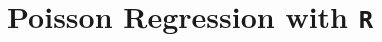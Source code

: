 \documentclass[00-GLMregression.tex]{subfiles}
\begin{document}
\newpage
\Large
\section{Poisson Regression with \texttt{R}}
		
\begin{verbatim}
		
		
		
\end{verbatim}	
		
		
\end{document}
